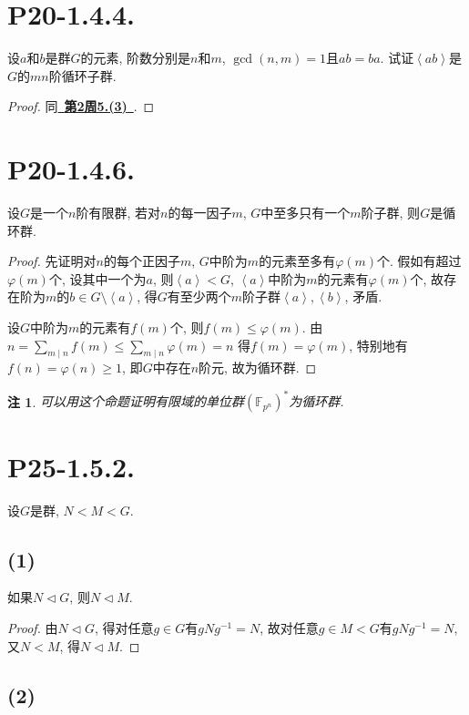 \documentclass[12pt, a4paper, fontset=windows]{ctexart}
\newcommand{\F}{\mathbb{F}}
\newcommand{\gen}[1]{\left\langle{#1}\right\rangle}
\newcommand{\myref}[2][]{\hyperref[#1]{\color{blue}\ {#2}\ }}
\newtheorem*{remark}{注}
\begin{document}
\section*{P20-1.4.4.}

设$a$和$b$是群$G$的元素, 阶数分别是$n$和$m$, 
$\gcd(n,m)=1$且$ab=ba$. 试证$\gen{ab}$是$G$的$mn$阶循环子群. 

\begin{proof}
同\myref[ord-mul]{\bf 第2周5.(3)}. 
\end{proof}

\section*{P20-1.4.6.}

设$G$是一个$n$阶有限群, 若对$n$的每一因子$m$, 
$G$中至多只有一个$m$阶子群, 则$G$是循环群. 

\begin{proof}
先证明对$n$的每个正因子$m$, $G$中阶为$m$的元素至多有$\varphi(m)$个. 
假如有超过$\varphi(m)$个, 设其中一个为$a$, 则$\gen{a}<G$, 
$\gen{a}$中阶为$m$的元素有$\varphi(m)$个, 故存在阶为$m$的$b\in G\setminus\gen{a}$, 
得$G$有至少两个$m$阶子群$\gen{a},\gen{b}$, 矛盾. 

设$G$中阶为$m$的元素有$f(m)$个, 则$f(m)\le\varphi(m)$. 由
$n=\sum_{m\mid n}f(m)\le\sum_{m\mid n}\varphi(m)=n$
得$f(m)=\varphi(m)$, 特别地有$f(n)=\varphi(n)\ge 1$, 
即$G$中存在$n$阶元, 故为循环群. 
\end{proof}

\begin{remark}
可以用这个命题证明有限域的单位群$(\F_{p^n})^*$为循环群. 
\end{remark}

\section*{P25-1.5.2.}

设$G$是群, $N<M<G$. 

\subsection*{(1)}

如果$N\lhd G$, 则$N\lhd M$. 

\begin{proof}
由$N\lhd G$, 得对任意$g\in G$有$gNg^{-1}=N$, 
故对任意$g\in M<G$有$gNg^{-1}=N$, 又$N<M$, 得$N\lhd M$. 
\end{proof}

\subsection*{(2)}
\end{document}
